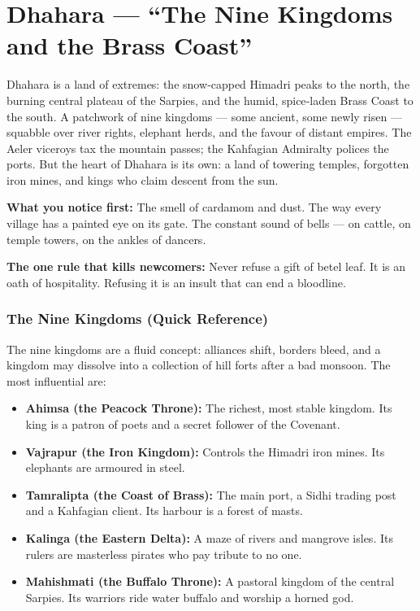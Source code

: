 \documentclass[11pt]{book}
\begin{document}
\clearpage
\chapter{Dhahara — ``The Nine Kingdoms and the Brass Coast''}
\label{sec:dhahara}

\begin{tcolorbox}[colback=black!3,colframe=blue!60!black,title={Theme \& Atmosphere}]
Dhahara is a land of extremes: the snow‑capped Himadri peaks to the north, the burning central plateau of the Sarpies, and the humid, spice‑laden Brass Coast to the south. A patchwork of nine kingdoms — some ancient, some newly risen — squabble over river rights, elephant herds, and the favour of distant empires. The Aeler viceroys tax the mountain passes; the Kahfagian Admiralty polices the ports. But the heart of Dhahara is its own: a land of towering temples, forgotten iron mines, and kings who claim descent from the sun.

\vspace{2mm}
\textbf{What you notice first:} The smell of cardamom and dust. The way every village has a painted eye on its gate. The constant sound of bells — on cattle, on temple towers, on the ankles of dancers.

\textbf{The one rule that kills newcomers:} Never refuse a gift of betel leaf. It is an oath of hospitality. Refusing it is an insult that can end a bloodline.
\end{tcolorbox}

\subsection*{The Nine Kingdoms (Quick Reference)}
The nine kingdoms are a fluid concept: alliances shift, borders bleed, and a kingdom may dissolve into a collection of hill forts after a bad monsoon. The most influential are:
\begin{itemize}
    \item \textbf{Ahimsa (the Peacock Throne):} The richest, most stable kingdom. Its king is a patron of poets and a secret follower of the Covenant.
    \item \textbf{Vajrapur (the Iron Kingdom):} Controls the Himadri iron mines. Its elephants are armoured in steel.
    \item \textbf{Tamralipta (the Coast of Brass):} The main port, a Sidhi trading post and a Kahfagian client. Its harbour is a forest of masts.
    \item \textbf{Kalinga (the Eastern Delta):} A maze of rivers and mangrove isles. Its rulers are masterless pirates who pay tribute to no one.
    \item \textbf{Mahishmati (the Buffalo Throne):} A pastoral kingdom of the central Sarpies. Its warriors ride water buffalo and worship a horned god.
\end{itemize}
\end{document}

